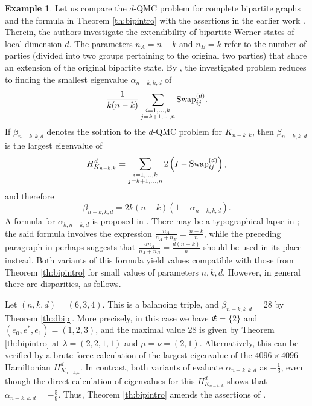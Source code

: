 \documentclass[12pt,dvipsnames,accepted=2016-08-18,a4paper,onecolumn]{quantumarticle}
\numberwithin{equation}{section}
\theoremstyle{definition}
\newtheorem{example}[theorem]{Example}
\begin{document}
\begin{example}\label{exa:jakab}
Let us compare the $d$-QMC problem for complete bipartite graphs and the formula in Theorem \ref{th:bipintro} with the assertions in the earlier work \cite{jakab}. Therein, the authors investigate the extendibility of bipartite Werner states of local dimension $d$. The parameters $n_A=n-k$ and $n_B=k$ refer to the number of parties (divided into two groups pertaining to the original two parties) that share an extension of the original bipartite state. By \cite[Eq. (4)]{jakab}, the investigated problem reduces to finding the smallest eigenvalue $\alpha_{n-k,k,d}$ of
$$\frac{1}{k(n-k)}\sum_{\substack{i=1,\dots,k \\ j=k+1,\dots,n}} \textnormal{Swap}^{(d)}_{ij}.$$
If $\beta_{n-k,k,d}$ denotes the solution to the $d$-QMC problem for $K_{n-k,k}$, then $\beta_{n-k,k,d}$ is the largest eigenvalue of
$$H_{K_{n-k,k}}^{d} = \sum_{\substack{i=1,\dots,k \\ j=k+1,\dots,n}} 
2\left(I - \textnormal{Swap}^{(d)}_{ij}\right),$$
and therefore
\begin{equation}\label{e:comparison}
\beta_{n-k,k,d} = 2k(n-k)(1-\alpha_{n-k,k,d}).
\end{equation}
A formula for $\alpha_{k,n-k,d}$ is proposed in \cite[Eq. (16)]{jakab}. There may be a typographical lapse in \cite[Eq. (16)]{jakab}; the said formula involves the expression $\frac{n_A}{n_A+n_B}=\frac{n-k}{n}$, while the preceding paragraph in \cite{jakab} perhaps suggests that $\frac{d n_A}{n_A+n_B}=\frac{d(n-k)}{n}$ should be used in its place instead. 
Both variants of this formula yield values compatible with those from Theorem \ref{th:bipintro} for small values of parameters $n,k,d$. 
However, in general there are disparities, as follows.

Let $(n,k,d)=(6,3,4)$. This is a balancing triple, and $\beta_{n-k,k,d}=28$ by Theorem \ref{th:dbip}. 
More precisely, in this case we have $\mathfrak{E}=\{2\}$ and $(e_0,e^*,e_1)=(1,2,3)$, and the maximal value 28 is given by Theorem \ref{th:bipintro} at $\lambda=(2,2,1,1)$ and $\mu=\nu=(2,1)$.
Alternatively, this can be verified by a brute-force calculation of the largest eigenvalue of the $4096\times 4096$ Hamiltonian $H_{K_{n-k,k}}^{d}$. In contrast, both variants of \cite[Eq. (16)]{jakab} evaluate $\alpha_{n-k,k,d}$ as $-\frac13$, 
even though the direct calculation of eigenvalues for this $H_{K_{n-k,k}}^{d}$ shows that $\alpha_{n-k,k,d}=-\frac59$. Thus, Theorem \ref{th:bipintro} amends the assertions of \cite{jakab}.
\end{example}
\end{document}
